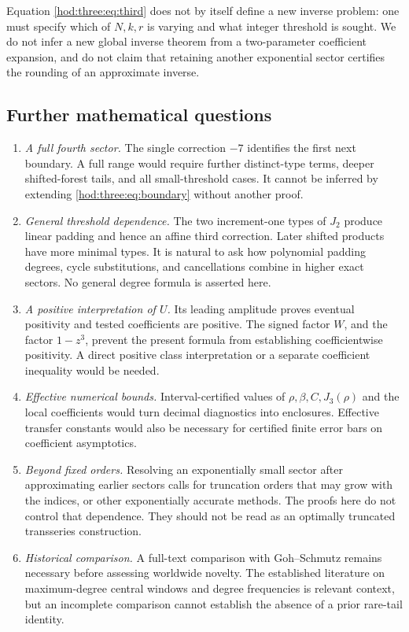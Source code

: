 \documentclass[11pt,letterpaper]{article}
\theoremstyle{definition}\newtheorem{definition}[theorem]{Definition}
\theoremstyle{remark}\newtheorem{remark}[theorem]{Remark}
\begin{document}
Equation \eqref{hod:three:eq:third} does not by itself define a new inverse problem: one must specify which of $N,k,r$ is varying and what integer threshold is sought. We do not infer a new global inverse theorem from a two-parameter coefficient expansion, and do not claim that retaining another exponential sector certifies the rounding of an approximate inverse.

\subsection{Further mathematical questions}
\begin{enumerate}
\item \emph{A full fourth sector.} The single correction $-7$ identifies the first next boundary. A full range would require further distinct-type terms, deeper shifted-forest tails, and all small-threshold cases. It cannot be inferred by extending \eqref{hod:three:eq:boundary} without another proof.
\item \emph{General threshold dependence.} The two increment-one types of $J_2$ produce linear padding and hence an affine third correction. Later shifted products have more minimal types. It is natural to ask how polynomial padding degrees, cycle substitutions, and cancellations combine in higher exact sectors. No general degree formula is asserted here.
\item \emph{A positive interpretation of $U$.} Its leading amplitude proves eventual positivity and tested coefficients are positive. The signed factor $W$, and the factor $1-z^3$, prevent the present formula from establishing coefficientwise positivity. A direct positive class interpretation or a separate coefficient inequality would be needed.
\item \emph{Effective numerical bounds.} Interval-certified values of $\rho,\beta,C,J_3(\rho)$ and the local coefficients would turn decimal diagnostics into enclosures. Effective transfer constants would also be necessary for certified finite error bars on coefficient asymptotics.
\item \emph{Beyond fixed orders.} Resolving an exponentially small sector after approximating earlier sectors calls for truncation orders that may grow with the indices, or other exponentially accurate methods. The proofs here do not control that dependence. They should not be read as an optimally truncated transseries construction.
\item \emph{Historical comparison.} A full-text comparison with Goh--Schmutz remains necessary before assessing worldwide novelty. The established literature on maximum-degree central windows and degree frequencies is relevant context, but an incomplete comparison cannot establish the absence of a prior rare-tail identity.
\end{enumerate}
\end{document}
